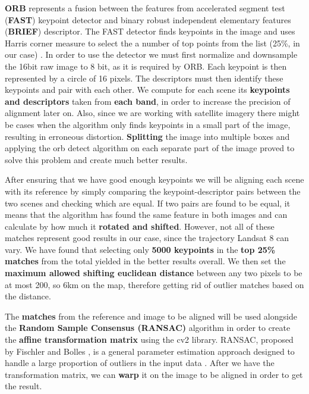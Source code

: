 \documentclass[12pt, a4paper]{report}
\begin{document}
	\par \textbf{ORB} represents a fusion between the features from accelerated segment test (\textbf{FAST}) keypoint detector and binary robust independent elementary features (\textbf{BRIEF}) descriptor. The FAST detector finds keypoints in the image and uses Harris corner measure to select the a number of top points from the list (25\%, in our case) \cite{orb}. In order to use the detector we must first normalize and downsample the 16bit raw image to 8 bit, as it is required by ORB. Each keypoint is then represented by a circle of 16 pixels. The descriptors must then identify these keypoints and pair with each other.
	We compute for each scene its \textbf{keypoints and descriptors} taken from \textbf{each band}, in order to increase the precision of alignment later on. Also, since we are working with satellite imagery there might be cases when the algorithm only finds keypoints in a small part of the image, resulting in erroneous distortion. \textbf{Splitting} the image into multiple boxes and applying the orb detect algorithm on each separate part of the image proved to solve this problem and create much better results. 
	
	\par After ensuring that we have good enough keypoints we will be aligning each scene with its reference by simply comparing the keypoint-descriptor pairs between the two scenes and checking which are equal. If two pairs are found to be equal, it means that the algorithm has found the same feature in both images and can calculate by how much it \textbf{rotated and shifted}. However, not all of these matches represent good results in our case, since the trajectory Landsat 8 can vary. We have found that selecting only \textbf{5000 keypoints} in the \textbf{top 25\% matches} from the total yielded in the better results overall. We then set the \textbf{maximum allowed shifting euclidean distance} between any two pixels to be at most 200, so 6km on the map, therefore getting rid of outlier matches based on the distance.
	
	\par The \textbf{matches} from the reference and image to be aligned will be used alongside the \textbf{Random Sample Consensus (RANSAC)} algorithm in order to create the \textbf{affine transformation matrix} using the cv2 library. RANSAC, proposed by Fischler and Bolles \cite{ransac}, is a general parameter estimation approach designed to handle a large proportion of outliers in the input data \cite{ransac2}. After we have the transformation matrix, we can \textbf{warp} it on the image to be aligned in order to get the result. 
	
\end{document}
